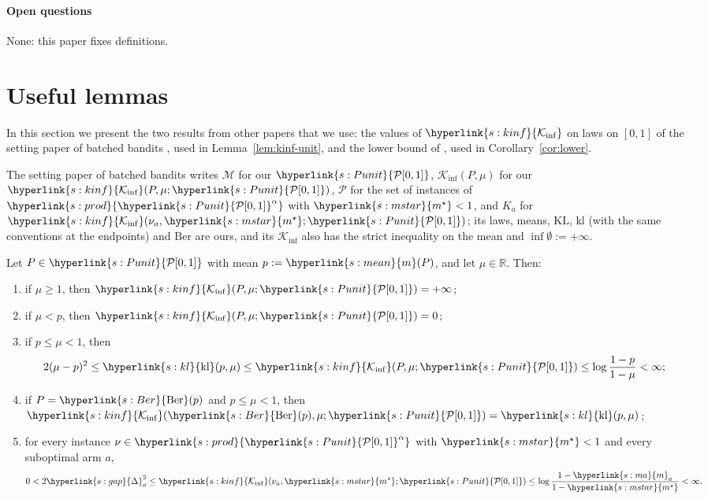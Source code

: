 \documentclass[11pt]{article}
\newcommand{\R}{\mathbb{R}}
\newcommand{\sy}[2]{{\hyperlink{#1}{#2}}}
\newcommand{\mean}{\sy{s:mean}{m}}
\newcommand{\kl}{\sy{s:kl}{\mathrm{kl}}}
\newcommand{\Ber}{\sy{s:Ber}{\mathrm{Ber}}}
\newcommand{\Kinf}{\sy{s:kinf}{\mathcal{K}_{\inf}}}
\newcommand{\Punit}{\sy{s:Punit}{\mathcal{P}[0,1]}}
\newcommand{\marm}{\sy{s:ma}{m}}
\newcommand{\ms}{\sy{s:mstar}{m^{\star}}}
\newcommand{\gap}{\sy{s:gap}{\Delta}}
\newcommand{\powc}[1]{\sy{s:prod}{#1^{\alpha}}}
\begin{document}
\paragraph{Open questions} None: this paper fixes definitions.

\appendix

\section{Useful lemmas}\label{sec:cited}

In this section we present the two results from other papers that we use: the values of $\Kinf$
on laws on $[0,1]$ of the setting paper of batched bandits \citep[Proposition~4.2]{INC-P006}, used in Lemma~\ref{lem:kinf-unit}, and the
lower bound of \citet[Theorem~1]{GMS19}, used in Corollary~\ref{cor:lower}.

The setting paper of batched bandits \citep{INC-P006} writes $\mathcal M$ for our $\Punit$, $\mathcal K_{\inf}(P,\mu)$ for our
$\Kinf(P,\mu;\Punit)$, $\mathcal P$ for the set of instances of $\powc{\Punit}$ with $\ms<1$, and
$K_a$ for $\Kinf(\nu_a,\ms;\Punit)$; its laws, means, $\mathrm{KL}$, $\mathrm{kl}$ (with the same
conventions at the endpoints) and $\mathrm{Ber}$ are ours, and its $\mathcal K_{\inf}$ also has the
strict inequality on the mean and $\inf\emptyset:=+\infty$.

\begin{theorem}\label{cite:INC-P006-prop:kinf}
Let $P\in\Punit$ with mean $p:=\mean(P)$, and let $\mu\in\R$. Then:
\begin{enumerate}[label=(\roman*)]
  \item if $\mu\ge1$, then $\Kinf(P,\mu;\Punit)=+\infty$;
  \item if $\mu<p$, then $\Kinf(P,\mu;\Punit)=0$;
  \item if $p\le\mu<1$, then
  \begin{equation*}
    2(\mu-p)^2\le\kl(p,\mu)\le\Kinf(P,\mu;\Punit)\le\log\frac{1-p}{1-\mu}<\infty;
  \end{equation*}
  \item if $P=\Ber(p)$ and $p\le\mu<1$, then $\Kinf(\Ber(p),\mu;\Punit)=\kl(p,\mu)$;
  \item for every instance $\nu\in\powc{\Punit}$ with $\ms<1$ and every suboptimal arm $a$,
  \begin{equation*}
    0<2\gap_a^2\le\Kinf(\nu_a,\ms;\Punit)\le\log\frac{1-\marm_a}{1-\ms}<\infty.
  \end{equation*}
\end{enumerate}
\end{theorem}
\end{document}
